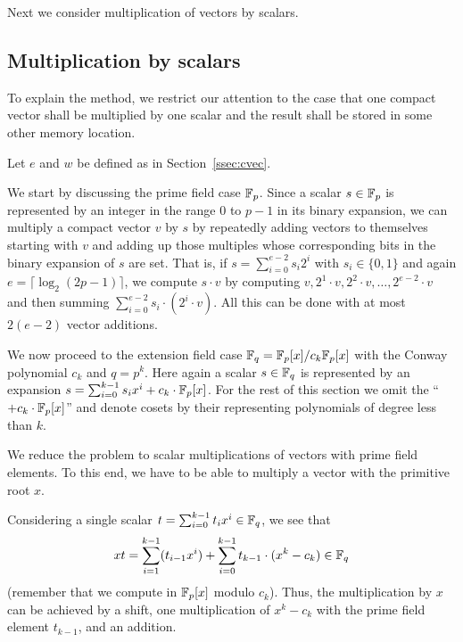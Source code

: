 Next we consider multiplication of vectors by scalars.

\subsection{Multiplication by scalars}

To explain the method, we restrict our attention to the case that one
compact vector shall be multiplied by one scalar and the result 
shall be stored in some other memory location.

Let $e$ and $w$ be defined as in Section~\ref{ssec:cvec}.

We start by discussing the prime field case $\mathbb{F}_p$.
Since a scalar $s \in \mathbb{F}_p$ is represented by an integer in the range $0$ 
to $p-1$ in its binary expansion, we can multiply a compact vector $v$
by $s$ by repeatedly adding vectors to themselves starting with $v$ and
adding up those multiples
whose corresponding bits in the binary expansion of $s$ are set. That is,
if $s = \sum_{i=0}^{e-2} s_i 2^i$ with $s_i \in \{0,1\}$ and again
$e = \lceil \log_2(2p-1) \rceil$, we compute $s\cdot v$ by computing
$v, 2^1 \cdot v, 2^2 \cdot v, \ldots, 2^{e-2} \cdot v$ and then summing
$\sum_{i=0}^{e-2} s_i \cdot (2^i \cdot v)$.
All this can be done with at most $2(e-2)$ vector additions.

We now proceed to the extension field case $\mathbb{F}_q = \mathbb{F}_p[x]/c_k \mathbb{F}_p[x]$ 
with the Conway polynomial $c_k$ and $q = p^k$.
Here again a scalar $s \in \mathbb{F}_q$ is represented by an expansion
$s = \sum_{i=0}^{k-1} s_i x^i + c_k \cdot \mathbb{F}_p[x]$. For the rest of this
section we omit the ``$+ c_k \cdot \mathbb{F}_p[x]$'' and denote cosets
by their representing polynomials of degree less than $k$.

We reduce the problem to scalar multiplications of vectors with
prime field elements. To this end, we have to be able to multiply
a vector with the primitive root $x$.

Considering a single scalar $t = \sum_{i=0}^{k-1} t_i x^i \in \mathbb{F}_q$, 
we see that 
\[ xt = \sum_{i=1}^{k-1} (t_{i-1}x^i) 
+ \sum_{i=0}^{k-1} t_{k-1} \cdot (x^k - c_k) \in \mathbb{F}_q \] 
(remember that we compute in $\mathbb{F}_p[x]$ modulo $c_k$).
Thus, the multiplication by $x$ can be achieved by a shift, one
multiplication of $x^k - c_k$ with the prime field element $t_{k-1}$,
and an addition.

